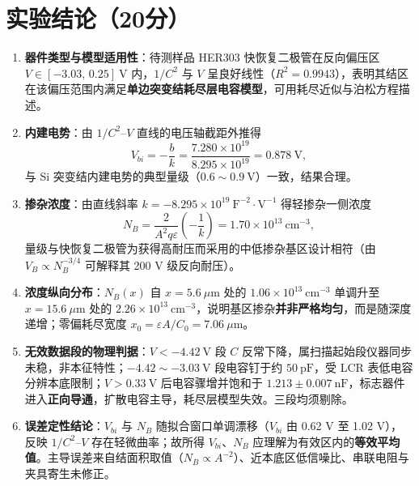 \documentclass[12pt,a4paper]{ctexart}
\begin{document}
\section*{实验结论（20分）}

\begin{enumerate}
    \item \textbf{器件类型与模型适用性}：待测样品 HER303 快恢复二极管在反向偏压区 $V\in[-3.03,\,0.25]\ \mathrm{V}$ 内，$1/C^{2}$ 与 $V$ 呈良好线性（$R^{2}=0.9943$），表明其结区在该偏压范围内满足\textbf{单边突变结耗尽层电容模型}，可用耗尽近似与泊松方程描述。
    
    \item \textbf{内建电势}：由 $1/C^{2}$--$V$ 直线的电压轴截距外推得
    \begin{equation}
    V_{bi}=-\frac{b}{k}=\frac{7.280\times10^{19}}{8.295\times10^{19}}=0.878\ \mathrm{V},
    \end{equation}
    与 Si 突变结内建电势的典型量级（$0.6\sim0.9\ \mathrm{V}$）一致，结果合理。
    
    \item \textbf{掺杂浓度}：由直线斜率 $k=-8.295\times10^{19}\ \mathrm{F^{-2}{\cdot}V^{-1}}$ 得轻掺杂一侧浓度
    \begin{equation}
    N_B=\frac{2}{A^{2}q\varepsilon}\left(-\frac{1}{k}\right)=1.70\times10^{13}\ \mathrm{cm^{-3}},
    \end{equation}
    量级与快恢复二极管为获得高耐压而采用的中低掺杂基区设计相符（由 $V_B\propto N_B^{-3/4}$ 可解释其 200 V 级反向耐压）。
    
    \item \textbf{浓度纵向分布}：$N_B(x)$ 自 $x=5.6\ \mu\mathrm{m}$ 处的 $1.06\times10^{13}\ \mathrm{cm^{-3}}$ 单调升至 $x=15.6\ \mu\mathrm{m}$ 处的 $2.26\times10^{13}\ \mathrm{cm^{-3}}$，说明基区掺杂\textbf{并非严格均匀}，而是随深度递增；零偏耗尽宽度 $x_0=\varepsilon A/C_0=7.06\ \mu\mathrm{m}$。
    
    \item \textbf{无效数据段的物理判据}：$V<-4.42\ \mathrm{V}$ 段 $C$ 反常下降，属扫描起始段仪器同步未稳，非本征特性；$-4.42\sim-3.03\ \mathrm{V}$ 段电容钉于约 $50\ \mathrm{pF}$，受 LCR 表低电容分辨本底限制；$V>0.33\ \mathrm{V}$ 后电容骤增并饱和于 $1.213\pm0.007\ \mathrm{nF}$，标志器件进入\textbf{正向导通}，扩散电容主导，耗尽层模型失效。三段均须剔除。
    
    \item \textbf{误差定性结论}：$V_{bi}$ 与 $N_B$ 随拟合窗口单调漂移（$V_{bi}$ 由 0.62 V 至 1.02 V），反映 $1/C^{2}$--$V$ 存在轻微曲率；故所得 $V_{bi}$、$N_B$ 应理解为有效区内的\textbf{等效平均值}。主导误差来自结面积取值（$N_B\propto A^{-2}$）、近本底区低信噪比、串联电阻与夹具寄生未修正。
\end{enumerate}
\end{document}

